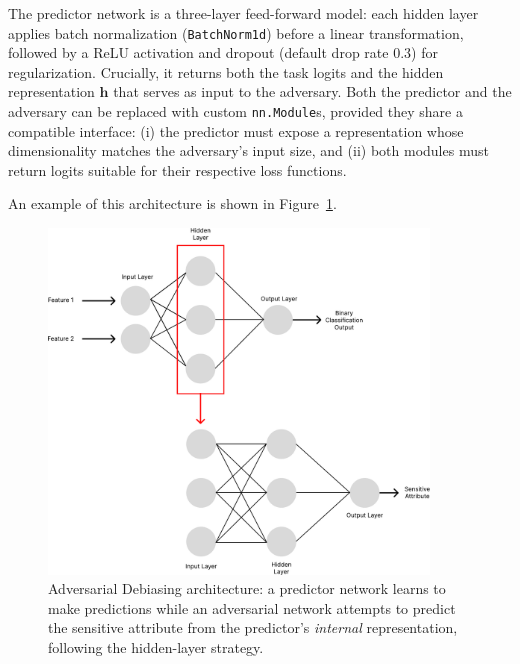 \documentclass[12pt,a4paper,openright,twoside]{book}
\begin{document}
The predictor network is a three-layer feed-forward model: each hidden layer applies batch normalization (\texttt{BatchNorm1d}) before a linear transformation, followed by a ReLU activation and dropout (default drop rate $0.3$) for regularization.  Crucially, it returns both the task logits and the hidden representation $\mathbf{h}$ that serves as input to the adversary.  Both the predictor and the adversary can be replaced with custom \texttt{nn.Module}s, provided they share a compatible interface: (i) the predictor must expose a representation whose dimensionality matches the adversary’s input size, and (ii) both modules must return logits suitable for their respective loss functions.

An example of this architecture is shown in Figure~\ref{fig:adversarial_debiasing}.
\begin{figure}
  \centering
  \includegraphics[width=0.9\textwidth]{figures/adversarial_debiasing.pdf}
  \caption{Adversarial Debiasing architecture: a predictor network learns to make predictions while an adversarial network attempts to predict the sensitive attribute from the predictor's \emph{internal} representation, following the hidden-layer strategy.}
  \label{fig:adversarial_debiasing}
\end{figure}
\end{document}
